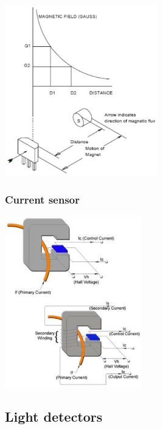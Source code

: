 \documentclass[11pt]{article}
\begin{document}
\begin{center}
\includegraphics[height=20em]{./images/hall-effect-proximity-sensor.png}
\end{center}
\subsubsection{Current sensor}
\label{sec:org7709d0e}
\begin{center}
\includegraphics[height=20em]{./images/hall-effect-current-sensor.png}
\end{center}
\subsection{Light detectors}
\label{sec:orgf60ef29}
\end{document}

